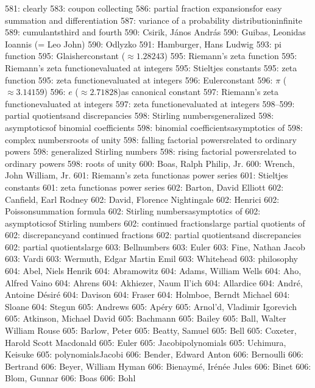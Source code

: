 581: clearly
583: coupon collecting
586: partial fraction expansions\sub for easy summation and differentiation
587: variance of a probability distribution\sub infinite
589: cumulants\sub third and fourth
590: Csirik, J\'anos Andr\'as
590: Guibas, Leonidas Ioannis (= Leo John)
590: Odlyzko
591: Hamburger, Hans Ludwig
593: pi function
595: Glaisher\sub constant ($\approx1.28243$)
595: Riemann's zeta function
595: Riemann's zeta function\sub evaluated at integers
595: Stieltjes \sub constants
595: zeta function
595: zeta function\sub evaluated at integers
596: Euler\sub constant
596: $\pi$ ($\approx3.14159$)
596: $e$ ($\approx2.71828$)\sub as canonical constant
597: Riemann's zeta function\sub evaluated at integers
597: zeta function\sub evaluated at integers
598--599: partial quotients\sub and discrepancies
598: Stirling numbers\sub generalized
598: asymptotics\sub of binomial coefficients
598: binomial coefficients\sub asymptotics of
598: complex numbers\sub roots of unity
598: falling factorial powers\sub related to ordinary powers
598: generalized Stirling numbers
598: rising factorial powers\sub related to ordinary powers
598: roots of unity
600: Boas, Ralph Philip, Jr.
600: Wrench, John William, Jr.
601: Riemann's zeta function\sub as power series
601: Stieltjes \sub constants
601: zeta function\sub as power series
602: Barton, David Elliott
602: Canfield, Earl Rodney
602: David, Florence Nightingale
602: Henrici
602: Poisson\sub summation formula
602: Stirling numbers\sub asymptotics of
602: asymptotics\sub of Stirling numbers
602: continued fractions\sub large partial quotients of
602: discrepancy\sub and continued fractions
602: partial quotients\sub and discrepancies
602: partial quotients\sub large
603: Bell\sub numbers
603: Euler
603: Fine, Nathan Jacob
603: Vardi
603: Wermuth, Edgar Martin Emil
603: Whitehead
603: philosophy
604: Abel, Niels Henrik
604: Abramowitz
604: Adams, William Wells
604: Aho, Alfred Vaino
604: Ahrens
604: Akhiezer, Naum Il'ich
604: Allardice
604: Andr\'e, Antoine D\'esir\'e
604: Davison
604: Fraser
604: Holmboe, Berndt Michael
604: Sloane
604: Stegun
605: Andrews
605: Ap\'ery
605: Arnol'd, Vladimir Igorevich
605: Atkinson, Michael David
605: Bachmann
605: Bailey
605: Ball, Walter William Rouse
605: Barlow, Peter
605: Beatty, Samuel
605: Bell
605: Coxeter, Harold Scott Macdonald
605: Euler
605: Jacobi\sub polynomials
605: Uchimura, Keisuke
605: polynomials\sub Jacobi
606: Bender, Edward Anton
606: Bernoulli
606: Bertrand
606: Beyer, William Hyman
606: Bienaym\'e, Ir\'en\'ee Jules
606: Binet
606: Blom, Gunnar
606: Boas
606: Bohl
